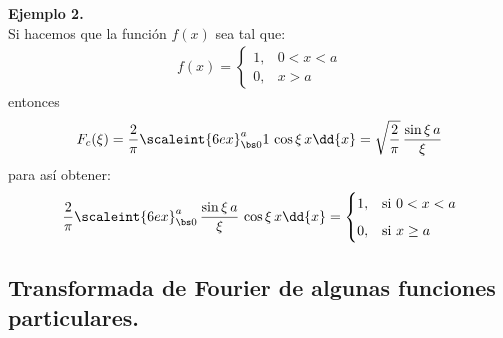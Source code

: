 \noindent
\textbf{Ejemplo 2.}
\\
Si hacemos que la función $f(x)$ sea tal que:
\begin{align*}
f(x) = \begin{cases}
1, & 0 < x < a \\[0.5em]
0, & x > a
\end{cases}
\end{align*}
entonces
\begin{align*}
F_{c}(\xi) = \dfrac{2}{\pi} \scaleint{6ex}_{\bs 0}^{a} 1 \, \cos \xi \, x \dd{x} = \sqrt{\dfrac{2}{\pi}} \, \dfrac{\sin \xi \, a}{\xi}
\end{align*}
para así obtener:
\begin{align*}
\dfrac{2}{\pi} \scaleint{6ex}_{\bs 0}^{a} \, \dfrac{\sin \xi \, a}{\xi} \, \cos \xi \, x \dd{x} = \begin{cases}
1, & \mbox{si } 0 < x < a \\[0.5em]
0, & \mbox{si } x \geq a
\end{cases}
\end{align*}

\subsection{Transformada de Fourier de algunas funciones particulares.}

